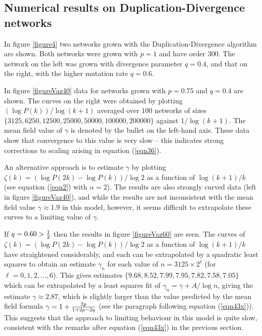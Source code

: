 \documentclass[12pt]{iopart}
\def\sfrac#1#2{\hbox{\normalsize $\frac{#1}{#2}$}}
\def\Ref#1{(\ref{#1})}
\begin{document}
\subsection{Numerical results on Duplication-Divergence networks}

In figure \ref{figure4} two networks grown with the Duplication-Divergence
algorithm are shown.  Both networks were grown with $p=1$ and have 
order $300$. The network on the left was grown with divergence parameter
$q=0.4$, and that on the right, with the higher mutation rate $q=0.6$.   

In figure \ref{figureVaz40} data for networks grown with $p=0.75$
and $q=0.4$ are shown.  The curves on the right were obtained by plotting
$(\log P(k))/\log(k+1)$ averaged over $100$ networks of sizes
$\{3125,6250,12500,25000,50000,100000,200000\}$ against $1/\log(k+1)$.
The mean field value of $\gamma$ is denoted by the bullet on the left-hand
axis.  These data show that convergence to this value is very slow -- this indicates
strong corrections to scaling arising in equation \Ref{eqn36}. 



An alternative approach is to estimate $\gamma$ by plotting $\zeta(k) = 
(\log P(2k) - \log P(k))/\log 2$ as a function of $\log(k+1)/k$ (see equation
\Ref{eqn2} with $\alpha=2$).  The results are also strongly curved data
(left in figure \ref{figureVaz40}), and while the results are not inconsistent 
with the mean field value $\gamma \approx 1.9$ in this model, 
however, it  seems difficult to extrapolate these curves to a limiting 
value of $\gamma$.

If $q=0.60>\sfrac{1}{2}$ then the results in figure \ref{figureVaz60} are seen.
The curves of $\zeta(k) = (\log P(2k) - \log P(k))/\log 2$ as a function of $\log(k+1)/k$ 
have straightened considerably, and each can be extrapolated by a quadratic
least squares to obtain an estimate $\gamma_n$ for each value of
$n=3125\times 2^\ell$ (for $\ell=0,1,2,\ldots,6$).  This gives estimates
$\{9.68,8.52,7.99,7.95,7.82,7.58,7.05\}$ which can be extrapolated by a
least squares fit of $\gamma_n = \gamma + A/\log n$, giving the estimate
$\gamma \approx 2.87$, which is slightly larger than the value predicted
by the mean field formula $\gamma = 1+ \sfrac{2p}{1+2p-2q}$
(see the paragraph following equation \Ref{eqn43x}).  This suggests that 
the approach to limiting behaviour in this model is quite slow, consistent with
the remarks after equation \Ref{eqn43x} in the previous section.
\end{document}
